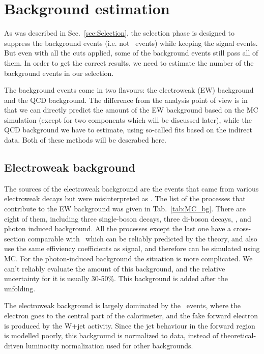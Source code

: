 \chapter{Background estimation}
\label{sec:Bkg}

As was described in Sec.~\ref{sec:Selection}, the selection phase is designed to suppress the background events (i.e. not \Zee\ events) while keeping the signal events. But even with all the cuts applied, some of the background events still pass all of them. In order to get the correct results, we need to estimate the number of the background events in our selection.

The background events come in two flavours: the electroweak (EW) background and the QCD background. The difference from the analysis point of view is in that we can directly predict the amount of the EW background based on the MC simulation (except for two components which will be discussed later), while the QCD background we have to estimate, using so-called fits based on the indirect data. Both of these methods will be descrabed here.

\section{Electroweak background}

The sources of the electroweak background are the events that came from various electroweak decays but were misinterpreted as \Zee. The list of the processes that contribute to the EW background was given in Tab.~\ref{tab:MC_bg}. There are eight of them, including three single-boson decays, three di-boson decays, \ttbar, and photon induced background. All the processes except the last one have a cross-section comparable with \Zee\ which can be reliably predicted by the theory, and also use the same effiviency coefficients as signal, and therefore can be simulated using MC. For the photon-induced background the situation is more complicated. We can't reliably evaluate the amount of this background, and the relative uncertainty for it is usually 30-50\%. This background is added after the unfolding.

The electroweak background is largely dominated by the \Wenu\ events, where the electron goes to the central part of the calorimeter, and the fake forward electron is produced by the W+jet activity. Since the jet behaviour in the forward region is modelled poorly, this background is normalized to data, instead of theoretical-driven luminocity normalization used for other backgrounds.

